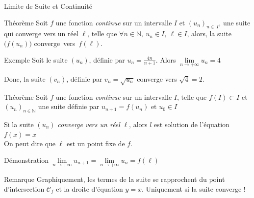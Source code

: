 \documentclass{coursbook}
\begin{document}
    \begin{Gpartie}{Limite de Suite et Continuité} 
        \begin{Spartie}{Théorème} 
            Soit $f$ une fonction \emph{continue} sur un intervalle $I$ et $(u_n)_{n\in\ I}$, une suite qui converge vers un réel $\ell$, telle que $\forall n\in\mathbb{N},\ u_n\in I,~\ell\in I$, alors, la suite $\big(f(u_n)\big)$ converge~vers~$f(\ell)$.
            \begin{SSpartie}{Exemple} 
                Soit le suite $(u_n)$, définie par $u_n=\frac{4n}{n+1}$. Alors $\lim\limits_{n\to +\infty}u_n=4$
                
                Donc, la suite $(v_n)$, définie par $v_n=\sqrt{u_n}$ converge vers $\sqrt{4}=2$.
            \end{SSpartie}
        \end{Spartie}
        \begin{Spartie}{Théorème}
            Soit $f$ une fonction \emph{continue} sur un intervalle $I$, telle que $f(I)\subset I$ et $(u_n)_{n\in\mathbb{N}}$ une suite définie par $u_{n+1}=f(u_n)$ et $u_0\in I$
            
            Si la suite $(u_n)$ \emph{converge vers un réel} $\ell$, alors $l$ est solution de l'équation $f(x)=x$ \\ On peut dire que $\ell$ est un point fixe de $f$.
            \begin{SSpartie}{Démonstration} 
                $\lim\limits_{n\to +\infty}u_{n+1}=\lim\limits_{n\to +\infty}u_n=f(\ell)$
            \end{SSpartie}
            \begin{SSpartie}{Remarque} 
                Graphiquement, les termes de la suite se rapprochent du point d'intersection $\mathcal{C}_f$ et la droite d'équation $y=x$. Uniquement si la suite converge !
                \begin{center}
\end{center}
\end{SSpartie}
\end{Spartie}
\end{Gpartie}
\end{document}
